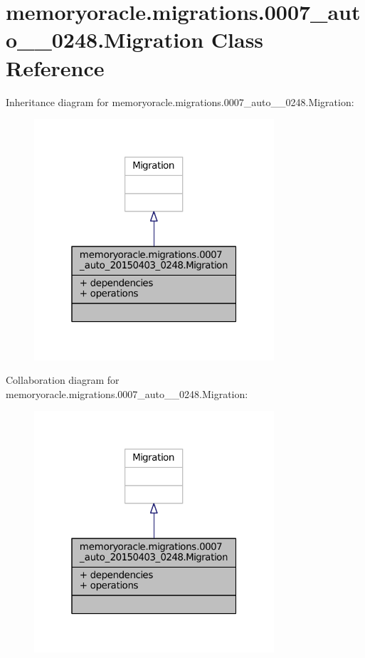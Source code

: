 \hypertarget{classmemoryoracle_1_1migrations_1_10007__auto__20150403__0248_1_1Migration}{}\section{memoryoracle.\+migrations.0007\+\_\+auto\+\_\+\_\+0248.Migration Class Reference}
\label{classmemoryoracle_1_1migrations_1_10007__auto__20150403__0248_1_1Migration}


Inheritance diagram for memoryoracle.\+migrations.0007\+\_\+auto\+\_\+\_\+0248.Migration\+:\nopagebreak
\begin{figure}[H]
\begin{center}
\leavevmode
\includegraphics[width=253pt]{classmemoryoracle_1_1migrations_1_10007__auto__20150403__0248_1_1Migration__inherit__graph}
\end{center}
\end{figure}


Collaboration diagram for memoryoracle.\+migrations.0007\+\_\+auto\+\_\+\_\+0248.Migration\+:\nopagebreak
\begin{figure}[H]
\begin{center}
\leavevmode
\includegraphics[width=253pt]{classmemoryoracle_1_1migrations_1_10007__auto__20150403__0248_1_1Migration__coll__graph}
\end{center}
\end{figure}

